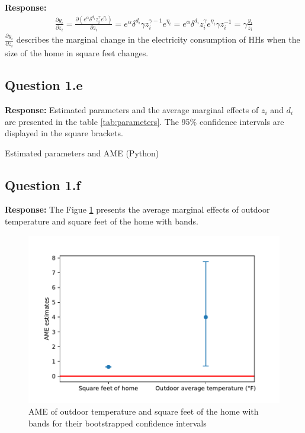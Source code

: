 \documentclass{article}
\begin{document}
\textbf{Response:}
\begin{align}
    \frac{\partial y_i}{\partial z_i} = \frac{\partial (e^{\alpha} \delta^{d_i} z_i^\gamma e^{\eta_i})}{\partial z_i} = 
                                       e^{\alpha} \delta^{d_i} \gamma z_i^{\gamma - 1} e^{\eta_i} = 
                                      e^{\alpha} \delta^{d_i} z_i^\gamma e^{\eta_i} \gamma z_i^{- 1} = 
                                      \gamma \frac{y_i}{z_i}
                                      \end{align}
\(\frac{\partial y_i}{\partial z_i}\) describes the marginal change in the electricity consumption of HHs when the size of the home in square feet changes. 

\subsection*{Question 1.e}
\textbf{Response:} 
Estimated parameters and the average marginal effects of \(z_i\) and \(d_i\) are presented in the table \ref{tab:parameters}. The 95\% confidence intervals are displayed in the square brackets. 

\begin{table}[hbt!]
    \centering
    
    \caption{Estimated parameters and AME (Python)}
    \label{tab:parameters}
        \end{table}


\subsection*{Question 1.f}
\textbf{Response:} 
The Figue \ref{fig:CI} presents the average marginal effects of outdoor temperature and square feet of the home with
bands.

\begin{figure}[hbt!]
    \centering
    \includegraphics[scale = 0.7]{homework 3/output/figure/hw3ame.pdf}
    \caption{AME of outdoor temperature and square feet of the home with bands for their bootstrapped confidence intervals}
    \label{fig:CI}
\end{figure}
\end{document}
